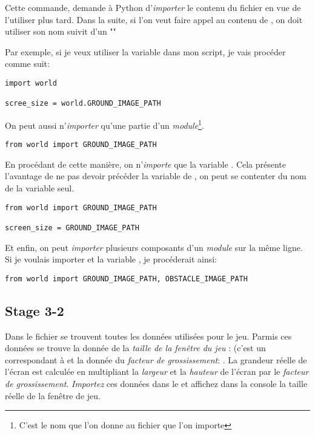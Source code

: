 Cette commande, demande à Python d'\emph{importer} le contenu du fichier  en vue de l'utiliser plus tard.
Dans la suite, si l'on veut faire appel au contenu de , on doit utiliser son nom suivit d'un ""

Par exemple, si je veux utiliser la variable  dans mon script, je vais procéder comme suit:

\begin{lstlisting}
import world

scree_size = world.GROUND_IMAGE_PATH
\end{lstlisting}

On peut aussi n'\emph{importer} qu'une partie d'un \emph{module}\footnote{C'est le nom que l'on donne au fichier que l'on importe}.

\begin{lstlisting}
from world import GROUND_IMAGE_PATH
\end{lstlisting}

En procédant de cette manière, on n'\emph{importe} que la variable .
Cela présente l'avantage de ne pas devoir précéder la variable  de , on peut se contenter du nom de la variable seul.

\begin{lstlisting}
from world import GROUND_IMAGE_PATH

screen_size = GROUND_IMAGE_PATH
\end{lstlisting}

Et enfin, on peut \emph{importer} plusieurs composants d'un \emph{module} sur la même ligne.
Si je voulais importer  et la variable , je procéderait ainsi:

\begin{lstlisting}
from world import GROUND_IMAGE_PATH, OBSTACLE_IMAGE_PATH
\end{lstlisting}

\subsection{Stage 3-2}
Dans le fichier  se trouvent toutes les données utilisées pour le jeu. Parmis ces données se trouve la donnée de la \textit{taille de la fenêtre du jeu} :  (c'est un  correspondant à  et la donnée du \textit{facteur de grossissement}: .
La grandeur réelle de l'écran est calculée en multipliant la \textit{largeur} et la \textit{hauteur} de l'écran par le \textit{facteur de grossissement}.
\emph{Importez} ces données dans le  et affichez dans la console la taille réelle de la fenêtre de jeu.

